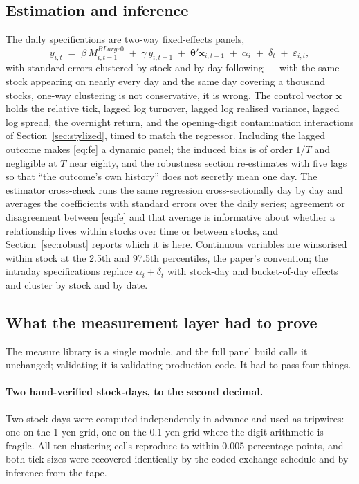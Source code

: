 \subsection{Estimation and inference}

The daily specifications are two-way fixed-effects panels,
%
\begin{equation}
y_{i,t} \;=\; \beta\, M^{B\mathit{Large}0}_{i,t-1}
\;+\; \gamma\, y_{i,t-1}
\;+\; \boldsymbol{\theta}' \mathbf{x}_{i,t-1}
\;+\; \alpha_i \;+\; \delta_t \;+\; \varepsilon_{i,t},
\label{eq:fe}
\end{equation}
%
with standard errors clustered by stock and by day following
\textcite{CameronGelbachMiller2011} --- with the same stock appearing on
nearly every day and the same day covering a thousand stocks, one-way
clustering is not conservative, it is wrong. The control vector
$\mathbf{x}$ holds the relative tick, lagged log turnover, lagged log realised
variance, lagged log spread, the overnight return, and the opening-digit
contamination interactions of Section~\ref{sec:stylized}, timed to match the
regressor. Including the lagged outcome makes \eqref{eq:fe} a dynamic panel;
the induced bias is of order $1/T$ \parencite{Nickell1981} and negligible at
$T$ near eighty, and the robustness section re-estimates with five lags so
that ``the outcome's own history'' does not secretly mean one day. The
estimator cross-check runs the same regression cross-sectionally day by day
and averages the coefficients \parencite{FamaMacBeth1973} with
\textcite{NeweyWest1987} standard errors over the daily series; agreement or
disagreement between \eqref{eq:fe} and that average is informative about
whether a relationship lives within stocks over time or between stocks, and
Section~\ref{sec:robust} reports which it is here. Continuous variables are
winsorised within stock at the 2.5th and 97.5th percentiles, the paper's
convention; the intraday specifications replace $\alpha_i + \delta_t$ with
stock-day and bucket-of-day effects and cluster by stock and by date.

\subsection{What the measurement layer had to prove}

The measure library is a single module, and the full panel build calls it
unchanged; validating it is validating production code. It had to pass four
things.

\paragraph{Two hand-verified stock-days, to the second decimal.}
Two stock-days were computed independently in advance and used as tripwires: one
on the 1-yen grid, one on the 0.1-yen grid where the digit arithmetic is fragile.
All ten clustering cells reproduce to within 0.005 percentage points, and both
tick sizes were recovered identically by the coded exchange schedule and by
inference from the tape.

